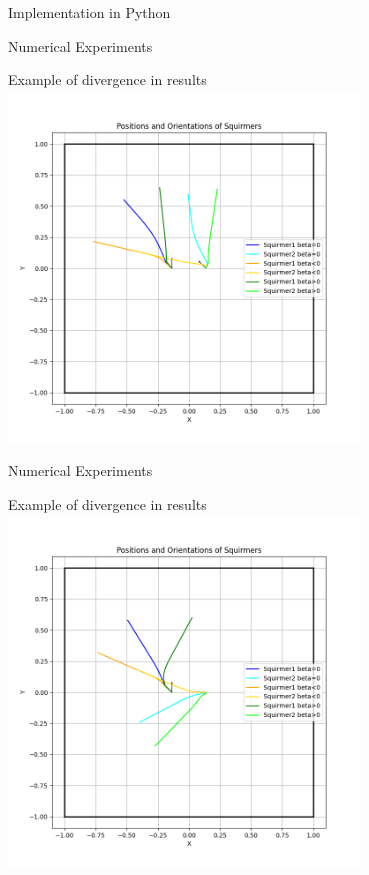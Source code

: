 \documentclass{beamer}
\begin{document}
\begin{frame}{Implementation in Python}
\begin{frame}{Numerical Experiments}
    \begin{center}
        Example of divergence in results
        \includegraphics[width=0.7\textwidth]{../../graphs/simulations/twosquirmerinter/sq2.3pi.4.png}
    \end{center}
\end{frame}

\begin{frame}{Numerical Experiments}
    \begin{center}
        Example of divergence in results
        \includegraphics[width=0.7\textwidth]{../../graphs/simulations/twosquirmerinter/sq2.pi.png}
    \end{center}
\end{frame}


\end{frame}
\end{document}
